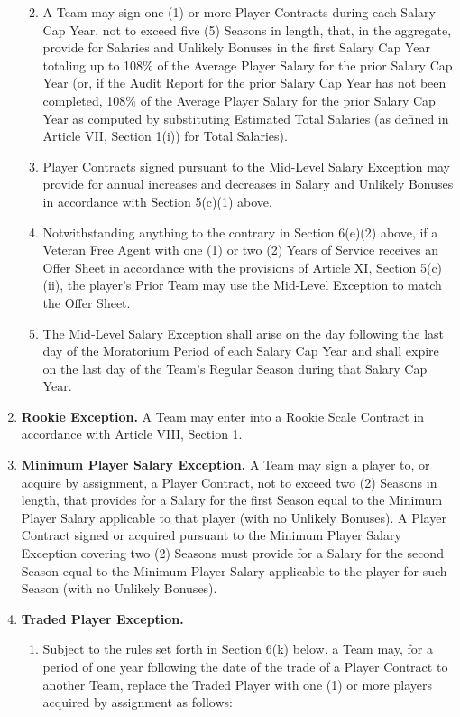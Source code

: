 \documentclass[
]{book}
\providecommand{\tightlist}{%
  \setlength{\itemsep}{0pt}\setlength{\parskip}{0pt}}
\begin{document}
\begin{enumerate}
  \begin{enumerate}
  \def\labelenumii{(\arabic{enumii})}
  \tightlist
  \item
    A Team may sign one (1) or more Player Contracts during each Salary Cap Year, not to exceed five (5) Seasons in length, that, in the aggregate, provide for Salaries and Unlikely Bonuses in the first Salary Cap Year totaling up to 108\% of the Average Player Salary for the prior Salary Cap Year (or, if the Audit Report for the prior Salary Cap Year has not been completed, 108\% of the Average Player Salary for the prior Salary Cap Year as computed by substituting Estimated Total Salaries (as defined in Article VII, Section 1(i)) for Total Salaries).
  \item
    Player Contracts signed pursuant to the Mid-Level Salary Exception may provide for annual increases and decreases in Salary and Unlikely Bonuses in accordance with Section 5(c)(1) above.
  \item
    Notwithstanding anything to the contrary in Section 6(e)(2) above, if a Veteran Free Agent with one (1) or two (2) Years of Service receives an Offer Sheet in accordance with the provisions of Article XI, Section 5(c)(ii), the player's Prior Team may use the Mid-Level Exception to match the Offer Sheet.
  \item
    The Mid-Level Salary Exception shall arise on the day following the last day of the Moratorium Period of each Salary Cap Year and shall expire on the last day of the Team's Regular Season during that Salary Cap Year.
  \end{enumerate}
\item
  \textbf{Rookie Exception.} A Team may enter into a Rookie Scale Contract in accordance with Article VIII, Section 1.
\item
  \textbf{Minimum Player Salary Exception.} A Team may sign a player to, or acquire by assignment, a Player Contract, not to exceed two (2) Seasons in length, that provides for a Salary for the first Season equal to the Minimum Player Salary applicable to that player (with no Unlikely Bonuses). A Player Contract signed or acquired pursuant to the Minimum Player Salary Exception covering two (2) Seasons must provide for a Salary for the second Season equal to the Minimum Player Salary applicable to the player for such Season (with no Unlikely Bonuses).
\item
  \textbf{Traded Player Exception.}

  \begin{enumerate}
  \def\labelenumii{(\arabic{enumii})}
  \item
    Subject to the rules set forth in Section 6(k) below, a Team may, for a period of one year following the date of the trade of a Player Contract to another Team, replace the Traded Player with one (1) or more players acquired by assignment as follows:


\end{enumerate}
\end{enumerate}
\end{document}
